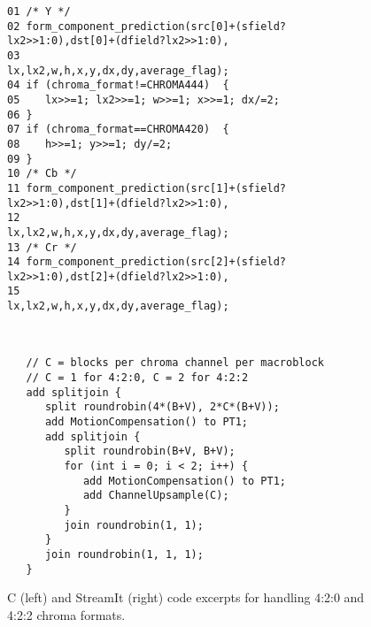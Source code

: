\label{section:chroma}

\begin{figure*}[t]
  \vspace{-6pt}
 \begin{minipage}[t]{4.1in}{
  \begin{scriptsize}
   \begin{verbatim}
01 /* Y */
02 form_component_prediction(src[0]+(sfield?lx2>>1:0),dst[0]+(dfield?lx2>>1:0),
03                           lx,lx2,w,h,x,y,dx,dy,average_flag);
04 if (chroma_format!=CHROMA444)  {
05    lx>>=1; lx2>>=1; w>>=1; x>>=1; dx/=2;
06 }
07 if (chroma_format==CHROMA420)  {
08    h>>=1; y>>=1; dy/=2;
09 }
10 /* Cb */
11 form_component_prediction(src[1]+(sfield?lx2>>1:0),dst[1]+(dfield?lx2>>1:0),
12                           lx,lx2,w,h,x,y,dx,dy,average_flag);
13 /* Cr */
14 form_component_prediction(src[2]+(sfield?lx2>>1:0),dst[2]+(dfield?lx2>>1:0),
15                           lx,lx2,w,h,x,y,dx,dy,average_flag);    
   \end{verbatim}
  \end{scriptsize}
 }
 \label{fig:chroma-stream}
\vspace{-12pt}
 \end{minipage}
 ~\vrule
 \begin{minipage}[t]{4.3in}{
  \begin{scriptsize}
   \begin{verbatim}
   // C = blocks per chroma channel per macroblock 
   // C = 1 for 4:2:0, C = 2 for 4:2:2
   add splitjoin {
      split roundrobin(4*(B+V), 2*C*(B+V));
      add MotionCompensation() to PT1;
      add splitjoin {
         split roundrobin(B+V, B+V);
         for (int i = 0; i < 2; i++) {
            add MotionCompensation() to PT1;
            add ChannelUpsample(C);
         }
         join roundrobin(1, 1);
      }
      join roundrobin(1, 1, 1);
   }
   \end{verbatim}
  \end{scriptsize}
 }
 \vspace{-12pt}
 \end{minipage}
 \caption{C (left) and StreamIt (right) code excerpts for handling
          4:2:0 and 4:2:2 chroma formats.} %
 \label{fig:chroma-format-code}
 \vspace{-8pt}
\end{figure*}

